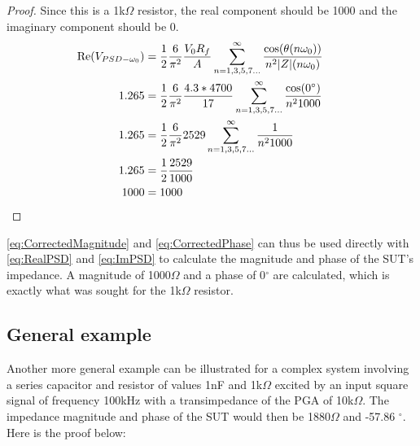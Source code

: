 \begin{proof}
Since this is a 1k$\Omega$ resistor, the real component should be 1000 and the imaginary component should be 0. 
    \begin{align*}
        \Re(V_{PSD-\omega_0}) & = \frac{1}{2}\frac{6}{\pi^2} \frac{V_0 R_f}{A} \displaystyle\sum_{n=1,3,5,7...} ^{\infty} \frac{\cos(\theta(n \omega_0))}{n^2\lvert Z \rvert (n \omega_0)}\nonumber\\
        1.265 & = \frac{1}{2} \frac{6}{\pi^2} \frac{4.3 * 4 700}{17} \displaystyle\sum_{n=1,3,5,7...} ^{\infty} \frac{\cos(0 ^\circ)}{n^2 1000}\nonumber\\
        1.265 & = \frac{1}{2} \frac{6}{\pi^2} 2529 \displaystyle\sum_{n=1,3,5,7...} ^{\infty} \frac{1}{n^2 1000}\nonumber\\
        1.265 & = \frac{1}{2} \frac{2529}{1000}\nonumber\\ 
        1000 & = 1000\nonumber &&\qedhere
    \end{align*}
\end{proof}
\autoref{eq:CorrectedMagnitude} and \autoref{eq:CorrectedPhase} can thus be used directly with \autoref{eq:RealPSD} and \autoref{eq:ImPSD} to calculate the magnitude and phase of the SUT's impedance. A magnitude of 1000$\Omega$ and a phase of 0$^\circ$ are calculated, which is exactly what was sought for the 1k$\Omega$ resistor.  \par

\subsection{General example}
Another more general example can be illustrated for a complex system involving a series capacitor and resistor of values 1nF and 1k$\Omega$ excited by an input square signal of frequency 100kHz with a transimpedance of the PGA of 10k$\Omega$. The impedance magnitude and phase of the SUT would then be 1880$\Omega$ and -57.86 $^\circ$. Here is the proof below:

